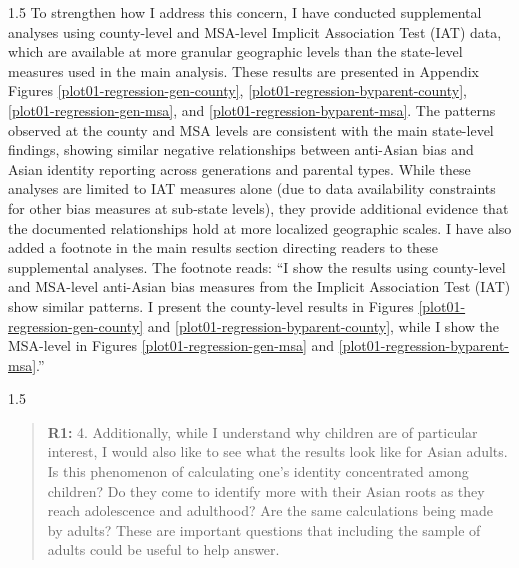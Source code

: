 \documentclass[12pt,english]{article}
\newcommand{\rrxspc}{1.5}
\begin{document}
\begin{refsection}
\begin{spacing}{\rrxspc}
            To strengthen how I address this concern, I have conducted supplemental analyses using county-level and MSA-level Implicit Association Test (IAT) data, which are available at more granular geographic levels than the state-level measures used in the main analysis. These results are presented in Appendix Figures \ref{plot01-regression-gen-county}, \ref{plot01-regression-byparent-county}, \ref{plot01-regression-gen-msa}, and \ref{plot01-regression-byparent-msa}. The patterns observed at the county and MSA levels are consistent with the main state-level findings, showing similar negative relationships between anti-Asian bias and Asian identity reporting across generations and parental types. While these analyses are limited to IAT measures alone (due to data availability constraints for other bias measures at sub-state levels), they provide additional evidence that the documented relationships hold at more localized geographic scales. I have also added a footnote in the main results section directing readers to these supplemental analyses. The footnote reads: ``I show the results using county-level and MSA-level anti-Asian bias measures from the Implicit Association Test (IAT) show similar patterns. I present the county-level results in Figures \ref{plot01-regression-gen-county} and \ref{plot01-regression-byparent-county}, while I show the MSA-level in Figures \ref{plot01-regression-gen-msa} and \ref{plot01-regression-byparent-msa}.''
    \end{spacing}
    
    \begin{spacing}{\rrxspc}
        \begin{quotation}
            \textbf{R1: } 4. Additionally, while I understand why children are of particular interest, I would also like to see what the results look like for Asian adults. Is this phenomenon of calculating one's identity concentrated among children? Do they come to identify more with their Asian roots as they reach adolescence and adulthood? Are the same calculations being made by adults? These are important questions that including the sample of adults could be useful to help answer.
        \end{quotation}
    \end{spacing}


\end{refsection}
\end{document}
